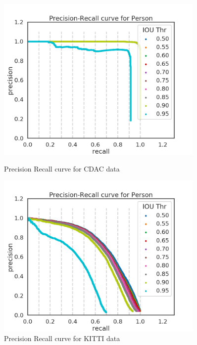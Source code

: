 \documentclass[12pt,letterpaper]{article}
\begin{document}
\begin{figure}
    \centering

    \begin{minipage}{0.45\textwidth}
        \centering
        \includegraphics[width=0.9\textwidth]{assets/SSD_MAP_CDAC.png}
        \caption{Precision Recall curve for CDAC data}
    \end{minipage} \hfill
    \begin{minipage}{0.45\textwidth}
        \centering
        \includegraphics[width=0.9\textwidth]{assets/SSD_MAP_KITTI.png}
        \caption{Precision Recall curve for KITTI data}
    \end{minipage}

\end{figure}
\end{document}
